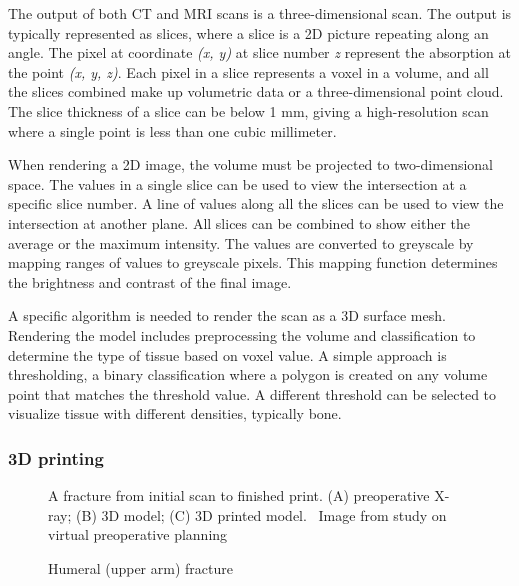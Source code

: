 \documentclass[a4paper]{report}
\begin{document}
The output of both CT and MRI scans is a three-dimensional scan. The output is typically represented as slices, where a slice is a 2D picture repeating along an angle. The pixel at coordinate \emph{(x, y)} at slice number \emph{z} represent the absorption at the point \emph{(x, y, z)}\cite{chougule_conversions_2013}.
Each pixel in a slice represents a voxel in a volume, and all the slices combined make up volumetric data or a three-dimensional point cloud\cite{chougule_conversions_2013}.
The slice thickness of a slice can be below 1 mm, giving a high-resolution scan where a single point is less than one cubic millimeter\cite{hamblen_outline_2010}.

When rendering a 2D image, the volume must be projected to two-dimensional space. The values in a single slice can be used to view the intersection at a specific slice number. A line of values along all the slices can be used to view the intersection at another plane.
All slices can be combined to show either the average or the maximum intensity\cite{fishman_volume_2006}.
The values are converted to greyscale by mapping ranges of values to greyscale pixels. This mapping function determines the brightness and contrast of the final image.

A specific algorithm is needed to render the scan as a 3D surface mesh. Rendering the model includes preprocessing the volume and classification to determine the type of tissue based on voxel value. A simple approach is thresholding, a binary classification where a polygon is created on any volume point that matches the threshold value. A different threshold can be selected to visualize tissue with different densities, typically bone\cite{fishman_volume_2006}.

\subsubsection{ 3D printing }

\begin{figure}[h!]
    \centering
	\hfill
  \caption{Humeral (upper arm) fracture}
  \small
    A fracture from initial scan to finished print. (A) preoperative X-ray; (B) 3D model; (C) 3D printed model.
~Image from study on virtual preoperative planning~\cite{mishra_virtual_2019}
\end{figure}
\end{document}
